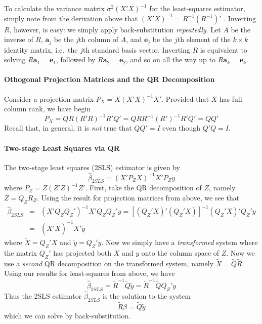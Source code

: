 \documentclass[12pt]{article}
\theoremstyle{definition}
\begin{document}
To calculate the variance matrix $\sigma^2 (X'X)^{-1}$ for the least-squares estimator, simply note from the derivation above that $(X'X)^{-1} = R^{-1} (R^{-1})'$ . Inverting $R$, however, is easy: we simply apply back-substitution \emph{repeatedly}. Let $A$ be the inverse of $R$, $\mathbf{a}_j$ be the $j$th column of $A$, and $\mathbf{e}_j$ be the $j$th element of the $k\times k$ identity matrix, i.e.\ the $j$th standard basis vector. Inverting $R$ is equivalent to solving $R \mathbf{a}_1 = \mathbf{e}_1$, followed by $R \mathbf{a}_2 = \mathbf{e}_2$, and so on all the way up to $R \mathbf{a}_k = \mathbf{e}_k$. 

\paragraph{Othogonal Projection Matrices and the QR Decomposition}
Consider a projection matrix $P_X = X (X'X)^{-1}X'$. Provided that $X$ has full column rank, we have
begin
  $$P_X  = QR(R'R)^{-1}R'Q' = QRR^{-1} (R')^{-1}R'Q' = QQ'$$
Recall that, in general, it is \emph{not} true that $QQ' = I$ even though $Q'Q = I$.

\paragraph{Two-stage Least Squares via QR} The two-stage least squares (2SLS) estimator is given by
  $$\widehat{\beta}_{2SLS} = (X' P_Z X)^{-1} X' P_Z y$$
where $P_Z = Z(Z'Z)^{-1}Z'$. First, take the QR decomposition of $Z$, namely $Z = Q_Z R_Z$. Using the result for projection matrices from above, we see that
\begin{eqnarray*}
  \widehat{\beta}_{2SLS} &=& (X' Q_Z Q_Z')^{-1} X' Q_Z Q_Z' y=\left[ (Q_Z' X)' (Q_Z' X)\right]^{-1} (Q_Z' X)' Q_Z' y\\
    &=& \left(\widetilde{X}' \widetilde{X}\right)^{-1} \widetilde{X}' \widetilde{y}
\end{eqnarray*}
where $\widetilde{X} = Q_Z' X$ and $\widetilde{y} = Q_Z' y$. Now we simply have a \emph{transformed} system where the matrix $Q_Z'$ has projected both $X$ and $y$ onto the column space of $Z$. Now we use a \emph{second} QR decomposition on the transformed system, namely $\widetilde{X} = \widetilde{Q} \widetilde{R}$. Using our results for least-squares from above, we have 
  $$\widehat{\beta}_{2SLS} = \widetilde{R}^{-1} \widetilde{Q} \widetilde{y} = \widetilde{R}^{-1} \widetilde{Q} Q_Z' y$$
Thus the 2SLS estimator $\widehat{\beta}_{2SLS}$ is the solution to the system
  $$\widetilde{R} \beta = \widetilde{Q} \widetilde{y}$$
which we can solve by back-substitution. 
\end{document}
